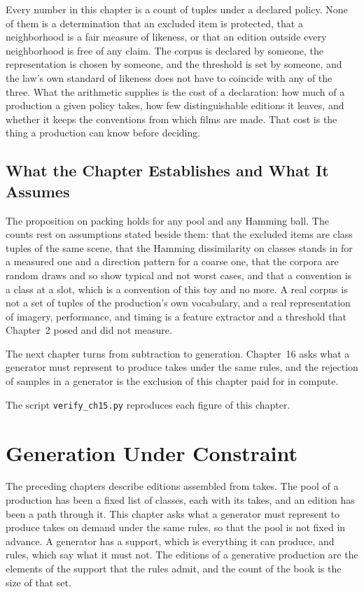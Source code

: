 \documentclass[11pt,twoside,openright]{book}
\theoremstyle{plain}
\theoremstyle{definition}
\theoremstyle{remark}
\begin{document}
Every number in this chapter is a count of tuples under a declared policy. None of them is a determination that an excluded item is protected, that a neighborhood is a fair measure of likeness, or that an edition outside every neighborhood is free of any claim. The corpus is declared by someone, the representation is chosen by someone, and the threshold is set by someone, and the law's own standard of likeness does not have to coincide with any of the three. What the arithmetic supplies is the cost of a declaration: how much of a production a given policy takes, how few distinguishable editions it leaves, and whether it keeps the conventions from which films are made. That cost is the thing a production can know before deciding.

\section{What the Chapter Establishes and What It Assumes}\label{sec:limits15}

The proposition on packing holds for any pool and any Hamming ball. The counts rest on assumptions stated beside them: that the excluded items are class tuples of the same scene, that the Hamming dissimilarity on classes stands in for a measured one and a direction pattern for a coarse one, that the corpora are random draws and so show typical and not worst cases, and that a convention is a class at a slot, which is a convention of this toy and no more. A real corpus is not a set of tuples of the production's own vocabulary, and a real representation of imagery, performance, and timing is a feature extractor and a threshold that Chapter~2 posed and did not measure.

The next chapter turns from subtraction to generation. Chapter~16 asks what a generator must represent to produce takes under the same rules, and the rejection of samples in a generator is the exclusion of this chapter paid for in compute.

The script \texttt{verify\_ch15.py} reproduces each figure of this chapter.

\chapter{Generation Under Constraint}
\label{ch:generation}

The preceding chapters describe editions assembled from takes. The pool of a production has been a fixed list of classes, each with its takes, and an edition has been a path through it. This chapter asks what a generator must represent to produce takes on demand under the same rules, so that the pool is not fixed in advance. A generator has a support, which is everything it can produce, and rules, which say what it must not. The editions of a generative production are the elements of the support that the rules admit, and the count of the book is the size of that set.
\end{document}
